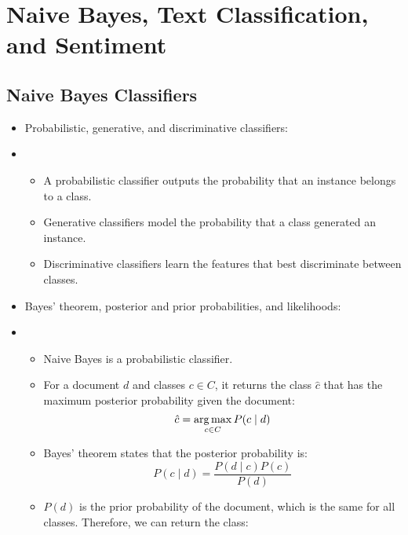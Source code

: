 \section{Naive Bayes, Text Classification, and Sentiment}

\subsection{Naive Bayes Classifiers}

\begin{itemize}
      \item Probabilistic, generative, and discriminative classifiers:
      \item[] \begin{itemize}
                  \item A probabilistic classifier outputs the probability that an instance belongs to a class.
                  \item Generative classifiers model the probability that a class generated an instance.
                  \item Discriminative classifiers learn the features that best discriminate between classes.
            \end{itemize}
      \item Bayes' theorem, posterior and prior probabilities, and likelihoods:
      \item[] \begin{itemize}
                  \item Naive Bayes is a probabilistic classifier.
                  \item For a document $d$ and classes $c \in C$, it returns the class $\hat{c}$ that has the maximum posterior probability given the document:
                        \begin{equation}
                              \hat{c} = \operatorname*{arg\,max}_{c \in C} P(c \mid d)
                        \end{equation}
                  \item Bayes' theorem states that the posterior probability is:
                        \begin{equation}
                              P(c \mid d) = \frac{P(d \mid c) P(c)}{P(d)}
                        \end{equation}
                  \item $P(d)$ is the prior probability of the document, which is the same for all classes.
                        Therefore, we can return the class:

\end{itemize}
\end{itemize}
